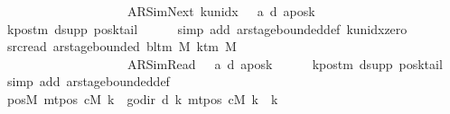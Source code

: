 \begin{isabellebody}
\ \ \ \ \ \ \ \ \ \ \ \ \ \ \ \ \ \ \ \ {\isacharparenleft}{\kern0pt}AR{\isacharunderscore}{\kern0pt}SimNext{\isacharcomma}{\kern0pt}\ k{\isacharunderscore}{\kern0pt}unidx\ {}{\isacharcomma}{\kern0pt}\ {}{\isacharcomma}{\kern0pt}\ a{\isacharprime}{\kern0pt}{\isacharcomma}{\kern0pt}\ d{\isacharcomma}{\kern0pt}\ {\isacharquery}{\kern0pt}aposk{\isacharparenright}{\kern0pt}{\isachardoublequoteclose}\isanewline
\ \ \ \ \isamarkupfalse%
\ kpos{\isacharunderscore}{\kern0pt}tm\ dsupp\ posk{}{\isacharunderscore}{\kern0pt}tail\isanewline
\ \ \ \ \isamarkupfalse%
\ {\isacharparenleft}{\kern0pt}simp\ add{\isacharcolon}{\kern0pt}\ ar{\isacharunderscore}{\kern0pt}stage{\isacharunderscore}{\kern0pt}bounded{\isacharunderscore}{\kern0pt}def\ k{\isacharunderscore}{\kern0pt}unidx{\isacharunderscore}{\kern0pt}zero{\isacharparenright}{\kern0pt}\isanewline
\ \ \isamarkupfalse%
\ src{\isacharunderscore}{\kern0pt}read{\isacharcolon}{\kern0pt}\ {\isachardoublequoteopen}ar{\isacharunderscore}{\kern0pt}stage{\isacharunderscore}{\kern0pt}bounded\ {\isacharparenleft}{\kern0pt}bl{\isacharunderscore}{\kern0pt}tm\ M{\isacharparenright}{\kern0pt}\ {\isacharparenleft}{\kern0pt}k{\isacharunderscore}{\kern0pt}tm\ M{\isacharparenright}{\kern0pt}\isanewline
\ \ \ \ \ \ \ \ \ \ \ \ \ \ \ \ \ \ \ \ {\isacharparenleft}{\kern0pt}AR{\isacharunderscore}{\kern0pt}SimRead{\isacharcomma}{\kern0pt}\ {}{\isacharcomma}{\kern0pt}\ {}{\isacharcomma}{\kern0pt}\ a{\isacharprime}{\kern0pt}{\isacharcomma}{\kern0pt}\ d{\isacharcomma}{\kern0pt}\ {\isacharquery}{\kern0pt}aposk{\isacharparenright}{\kern0pt}{\isachardoublequoteclose}\isanewline
\ \ \ \ \isamarkupfalse%
\ kpos{\isacharunderscore}{\kern0pt}tm\ dsupp\ posk{}{\isacharunderscore}{\kern0pt}tail\ \isamarkupfalse%
\ {\isacharparenleft}{\kern0pt}simp\ add{\isacharcolon}{\kern0pt}\ ar{\isacharunderscore}{\kern0pt}stage{\isacharunderscore}{\kern0pt}bounded{\isacharunderscore}{\kern0pt}def{\isacharparenright}{\kern0pt}\isanewline
\ \ %
\isanewline
\ \ \isamarkupfalse%
\ posM{}{\isacharcolon}{\kern0pt}\ {\isachardoublequoteopen}mt{\isacharunderscore}{\kern0pt}pos\ cM{\isacharunderscore}{\kern0pt}{}\ k\ {\isacharequal}{\kern0pt}\ go{\isacharunderscore}{\kern0pt}dir\ {\isacharparenleft}{\kern0pt}d\ k{\isacharparenright}{\kern0pt}\ {\isacharparenleft}{\kern0pt}mt{\isacharunderscore}{\kern0pt}pos\ cM\ k{\isacharparenright}{\kern0pt}{\isachardoublequoteclose}\ \ k\isanewline

\end{isabellebody}
